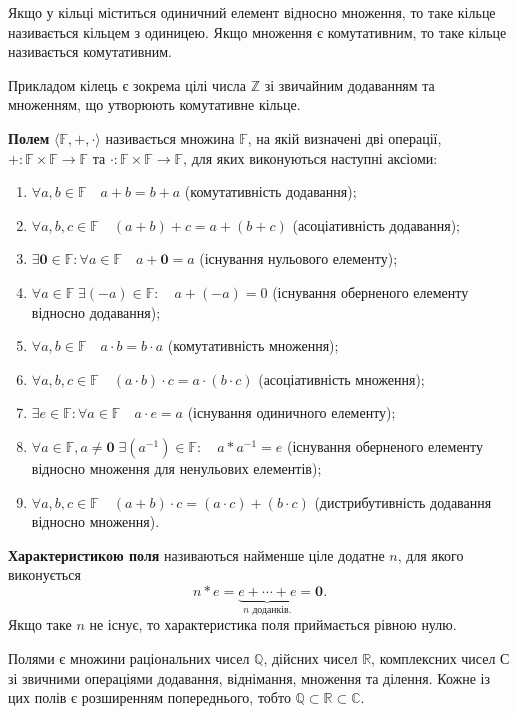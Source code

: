 Якщо у кільці міститься одиничний елемент відносно множення, то таке кільце називається кільцем з одиницею. Якщо множення є комутативним, то таке кільце називається комутативним.

Прикладом кілець є зокрема цілі числа $\mathbb{Z}$ зі звичайним додаванням та множенням, що  утворюють комутативне кільце. 


\textbf{Полем} $\langle \mathbb{F}, +, \cdot \rangle$ називається множина $\mathbb{F}$, на якій визначені дві операції, $+: \mathbb{F} \times \mathbb{F} \to \mathbb{F}$ та $\cdot: \mathbb{F} \times \mathbb{F} \to \mathbb{F}$, для яких виконуються наступні аксіоми:
\begin{enumerate}[noitemsep,partopsep=0pt,topsep=0pt,parsep=0pt]
\item $\forall a,b \in \mathbb{F} \quad a+b=b+a$ (комутативність додавання);
\item $\forall a,b,c \in \mathbb{F} \quad (a+b)+c=a+(b+c)$ (асоціативність додавання);
\item $\exists \mathbf{0} \in \mathbb{F}: \forall a \in \mathbb{F} \quad a+\mathbf{0}=a$ (існування нульового елементу);
\item $\forall a \in \mathbb{F} \; \exists (-a) \in \mathbb{F}: \quad a+(-a)=0$ (існування оберненого елементу відносно додавання);
\item $\forall a,b \in \mathbb{F} \quad a \cdot b=b \cdot a$ (комутативність множення);
\item $\forall a,b,c \in \mathbb{F} \quad (a \cdot b) \cdot c=a \cdot (b \cdot c)$ (асоціативність множення);
\item $\exists e \in \mathbb{F}: \forall a \in \mathbb{F} \quad a \cdot e=a$ (існування одиничного елементу);
\item $\forall a \in \mathbb{F}, a \neq \mathbf{0} \; \exists (a^{-1}) \in \mathbb{F}: \quad a*a^{-1}=e$ (існування оберненого елементу відносно множення для ненульових елементів);
\item $\forall a,b,c \in \mathbb{F} \quad (a+b) \cdot c=(a \cdot c)+(b \cdot c)$ (дистрибутивність додавання відносно множення).
\end{enumerate} 


\textbf{Характеристикою поля} називаються найменше ціле додатне $n$, для якого виконується 
\[
n*e = \underbrace{e+\cdots+e}_{\text{$n$ доданків.}} = \textbf{0}.
\]
Якщо таке $n$ не існує, то характеристика поля приймається рівною нулю.


Полями є множини раціональних чисел $\mathbb{Q}$, дійсних чисел $\mathbb{R}$, комплексних чисел $\mathbb{С}$ зі звичними операціями додавання, віднімання, множення та ділення. Кожне із цих полів є розширенням попереднього, тобто $\mathbb{Q} \subset \mathbb{R} \subset \mathbb{C}$.
 


